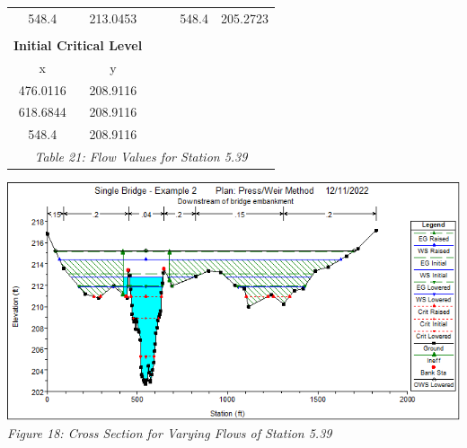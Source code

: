 \begin{center}
\begin{tabular}{|cc|cc|cc|}
        548.4    & 213.0453                                      &          &                                           & 548.4    & 205.2723                                          \\
                 &                                               &          &                                           &          &                                                   \\
        \multicolumn{2}{|c|}{\textbf{Initial Critical Level}}    &          &                                           &          &                                                   \\ 
        \cline{1-2}
        x        & y                                             &          &                                           &          &                                                   \\
        476.0116 & 208.9116                                      &          &                                           &          &                                                   \\
        618.6844 & 208.9116                                      &          &                                           &          &                                                   \\
        548.4    & 208.9116                                      &          &                                           &          &                                                   \\
        \hline\multicolumn{6}{c}{\emph{Table 21: Flow Values for Station 5.39}}
        \end{tabular}

        \begin{center}
            \includegraphics[scale=0.7, frame]{fig18.png}
            \\\emph{Figure 18: Cross Section for Varying Flows of Station 5.39}\\
        \end{center}
        \newpage
    \end{center}

